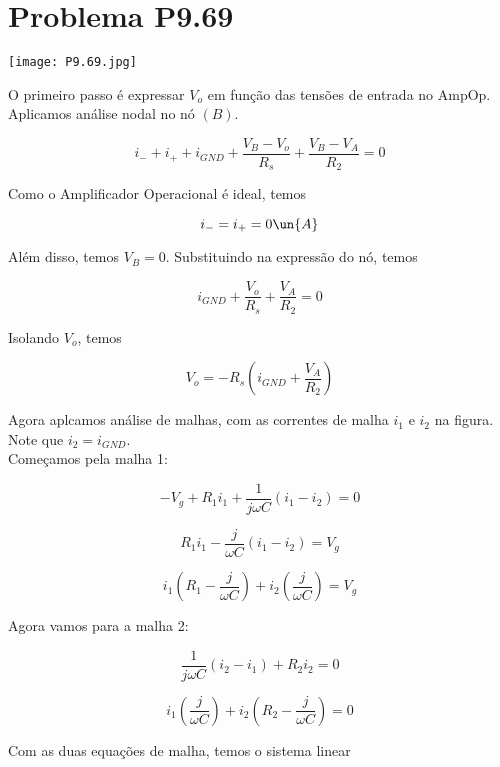 \section*{Problema P9.69}

\renewcommand*\thesection{9.69}

\begin{center}
    \texttt{[image: P9.69.jpg]}
\end{center}

O primeiro passo é expressar $V_o$ em função das tensões de entrada no AmpOp.
Aplicamos análise nodal no nó $(B)$.

\[ i_- + i_+ + i_{GND} + \frac{V_B - V_o}{R_s} + \frac{V_B - V_A}{R_2} = 0 \]

Como o Amplificador Operacional é ideal, temos

\begin{equation}\label{eq:9.69.1}
    i_- = i_+ = 0 \un{A}
\end{equation}

Além disso, temos $V_B = 0$. Substituindo na expressão do nó, temos

\[ i_{GND} + \frac{V_o}{R_s} + \frac{V_A}{R_2} = 0 \]

Isolando $V_o$, temos

\begin{equation}\label{eq:9.69.2}
    V_o = - R_s\left(i_{GND} + \frac{V_A}{R_2}\right)
\end{equation}

Agora aplcamos análise de malhas, com as correntes de malha $i_1$ e $i_2$ na figura. Note que $i_2 = i_{GND}$. \\
Começamos pela malha 1:

\[ -V_g + R_1i_1 + \frac{1}{j\omega C}(i_1 - i_2) = 0 \]

\[ R_1i_1 - \frac{j}{\omega C}(i_1 - i_2) = V_g \]

\[ i_1\left(R_1 - \frac{j}{\omega C}\right) + i_2\left(\frac{j}{\omega C}\right) = V_g \]

Agora vamos para a malha 2:

\[ \frac{1}{j\omega C}(i_2 - i_1) + R_2i_2 = 0 \]

\[ i_1\left(\frac{j}{\omega C}\right) + i_2\left(R_2 - \frac{j}{\omega C}\right) = 0 \]

Com as duas equações de malha, temos o sistema linear

\begingroup
\renewcommand*{\arraystretch}{3}

